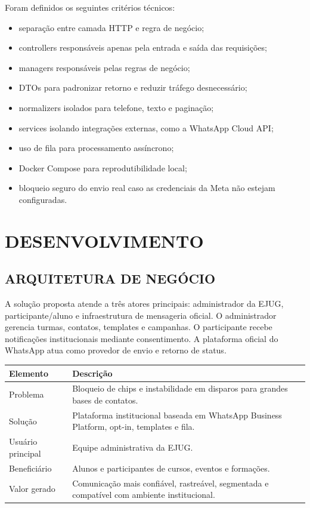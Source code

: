 \documentclass[12pt,letterpaper,oneside]{report}
\begin{document}
Foram definidos os seguintes critérios técnicos:

\begin{itemize}
  \item separação entre camada HTTP e regra de negócio;
  \item controllers responsáveis apenas pela entrada e saída das requisições;
  \item managers responsáveis pelas regras de negócio;
  \item DTOs para padronizar retorno e reduzir tráfego desnecessário;
  \item normalizers isolados para telefone, texto e paginação;
  \item services isolando integrações externas, como a WhatsApp Cloud API;
  \item uso de fila para processamento assíncrono;
  \item Docker Compose para reprodutibilidade local;
  \item bloqueio seguro do envio real caso as credenciais da Meta não estejam configuradas.
\end{itemize}

\chapter{DESENVOLVIMENTO}

\section{ARQUITETURA DE NEGÓCIO}

A solução proposta atende a três atores principais: administrador da EJUG, participante/aluno e infraestrutura de mensageria oficial. O administrador gerencia turmas, contatos, templates e campanhas. O participante recebe notificações institucionais mediante consentimento. A plataforma oficial do WhatsApp atua como provedor de envio e retorno de status.

\begin{quadro}[H]
\centering
\caption{Visão de negócio da solução}
\vspace{0.3cm}
\begin{tabular}{|p{4cm}|p{9cm}|}
\hline
\textbf{Elemento} & \textbf{Descrição}\\
\hline
Problema & Bloqueio de chips e instabilidade em disparos para grandes bases de contatos.\\
\hline
Solução & Plataforma institucional baseada em WhatsApp Business Platform, opt-in, templates e fila.\\
\hline
Usuário principal & Equipe administrativa da EJUG.\\
\hline
Beneficiário & Alunos e participantes de cursos, eventos e formações.\\
\hline
Valor gerado & Comunicação mais confiável, rastreável, segmentada e compatível com ambiente institucional.\\
\hline
\end{tabular}
\end{quadro}
\end{document}
